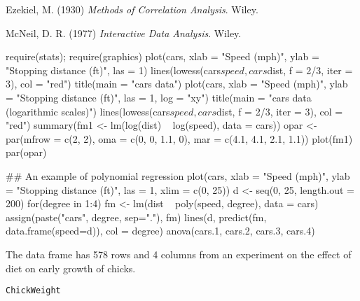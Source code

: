%
\begin{Source}\relax
Ezekiel, M. (1930)
\emph{Methods of Correlation Analysis}.
Wiley.
\end{Source}
%
\begin{References}\relax
McNeil, D. R. (1977)
\emph{Interactive Data Analysis}.
Wiley.
\end{References}
%
\begin{Examples}
\begin{ExampleCode}
require(stats); require(graphics)
plot(cars, xlab = "Speed (mph)", ylab = "Stopping distance (ft)",
     las = 1)
lines(lowess(cars$speed, cars$dist, f = 2/3, iter = 3), col = "red")
title(main = "cars data")
plot(cars, xlab = "Speed (mph)", ylab = "Stopping distance (ft)",
     las = 1, log = "xy")
title(main = "cars data (logarithmic scales)")
lines(lowess(cars$speed, cars$dist, f = 2/3, iter = 3), col = "red")
summary(fm1 <- lm(log(dist) ~ log(speed), data = cars))
opar <- par(mfrow = c(2, 2), oma = c(0, 0, 1.1, 0),
            mar = c(4.1, 4.1, 2.1, 1.1))
plot(fm1)
par(opar)

## An example of polynomial regression
plot(cars, xlab = "Speed (mph)", ylab = "Stopping distance (ft)",
    las = 1, xlim = c(0, 25))
d <- seq(0, 25, length.out = 200)
for(degree in 1:4) {
  fm <- lm(dist ~ poly(speed, degree), data = cars)
  assign(paste("cars", degree, sep="."), fm)
  lines(d, predict(fm, data.frame(speed=d)), col = degree)
}
anova(cars.1, cars.2, cars.3, cars.4)
\end{ExampleCode}
\end{Examples}
%
\begin{Description}\relax
The  data frame has 578 rows and 4 columns from an
experiment on the effect of diet on early growth of chicks.
\end{Description}
%
\begin{Usage}
\begin{verbatim}
ChickWeight
\end{verbatim}
\end{Usage}
%
